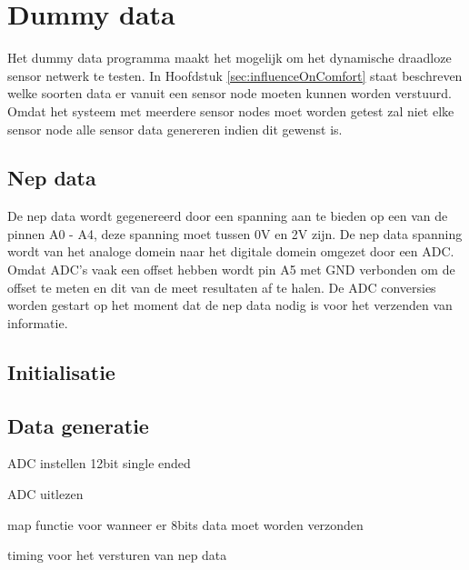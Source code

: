 \section{Dummy data} \label{sec:dummyData}
Het dummy data programma maakt het mogelijk om het dynamische draadloze sensor netwerk te testen. In Hoofdstuk \ref{sec:influenceOnComfort} staat beschreven welke soorten data er vanuit een sensor node moeten kunnen worden verstuurd. Omdat het systeem met meerdere sensor nodes moet worden getest zal niet elke sensor node alle sensor data genereren indien dit gewenst is. 

\subsection{Nep data}
De nep data wordt gegenereerd door een spanning aan te bieden op een van de pinnen A0 - A4, deze spanning moet tussen 0V en 2V zijn. De nep data spanning wordt van het analoge domein naar het digitale domein omgezet door een ADC. Omdat ADC's vaak een offset hebben wordt pin A5 met GND verbonden om de offset te meten en dit van de meet resultaten af te halen. De ADC conversies worden gestart op het moment dat de nep data nodig is voor het verzenden van informatie.

\subsection{Initialisatie}

\subsection{Data generatie}

ADC instellen 12bit single ended

ADC uitlezen

map functie voor wanneer er 8bits data moet worden verzonden

timing voor het versturen van nep data

\subsection{}